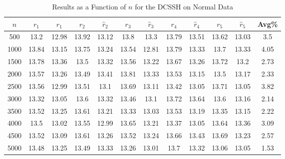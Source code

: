 \documentclass[11pt,twoside]{report}
\theoremstyle{definition}
\numberwithin{theorem}{section}
\numberwithin{definition}{section}
\numberwithin{lemma}{section}
\numberwithin{proposition}{section}
\numberwithin{equation}{section}
\numberwithin{figure}{section}
\begin{document}
\begin{appendices}
    \begin{table}[ht]
        \centering
        \begin{tabular}{|c||cc||cc||cc||cc||cc||c|} \hline
            $n$&$r_1$&$\hat{r}_1$&$r_2$&$\hat{r}_2$&$r_3$&$\hat{r}_3$&$r_4$&$\hat{r}_4$&$r_5$&$\hat{r}_5$&Avg\% \\ \hline
            500&13.2&12.98&13.92&13.12&13.8&13.3&13.79&13.51&13.62&13.03&3.5 \\
            1000&13.84&13.15&13.75&13.24&13.54&12.81&13.79&13.33&13.7&13.33&4.05 \\
            1500&13.78&13.36&13.5&13.32&13.56&13.22&13.67&13.26&13.72&13.2&2.73 \\
            2000&13.57&13.26&13.49&13.41&13.81&13.33&13.53&13.15&13.5&13.17&2.33 \\
            2500&13.56&12.99&13.51&13.1&13.69&13.11&13.42&13.05&13.71&13.05&3.82 \\
            3000&13.32&13.05&13.6&13.32&13.46&13.1&13.72&13.64&13.6&13.16&2.14 \\
            3500&13.52&13.25&13.61&13.21&13.33&13.03&13.53&13.19&13.35&13.15&2.22 \\
            4000&13.5&13.02&13.55&12.99&13.65&13.21&13.37&13.05&13.64&13.36&3.09 \\
            4500&13.52&13.09&13.61&13.26&13.52&13.24&13.66&13.43&13.69&13.23&2.57 \\
            5000&13.48&13.25&13.49&13.33&13.26&13.01&13.7&13.32&13.06&13.05&1.53 \\ \hline
        \end{tabular}
        \caption{Results as a Function of $n$ for the DCSSH on Normal Data}
        \label{tab:normal_dcssh_table_n}
    \end{table}
    

\end{appendices}
\end{document}
